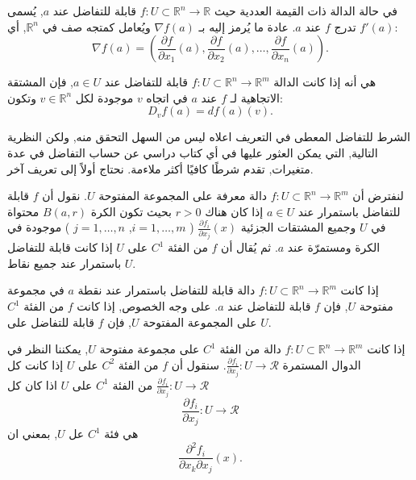في حالة الدالة ذات القيمة العددية حيث \( f : U \subset \mathbb{R}^n \to \mathbb{R} \) قابلة للتفاضل عند \( a \), يُسمى \( f'(a) \) تدرج \( f \) عند \( a \). عادة ما يُرمز إليه بـ \( \nabla f(a) \) ويُعامل كمتجه صف في \( \mathbb{R}^n \), أي:
\[ \nabla f(a) = \left( \frac{\partial f}{\partial x_1} (a), \frac{\partial f}{\partial x_2} (a), \ldots, \frac{\partial f}{\partial x_n} (a) \right). \]

هي أنه إذا كانت الدالة \( f : U \subset \mathbb{R}^n \to \mathbb{R}^m \) قابلة للتفاضل عند \( a \in U \), فإن المشتقة الاتجاهية لـ \( f \) عند \( a \) في اتجاه \( v \) موجودة لكل \( v \in \mathbb{R}^n \) وتكون:
\[ D_v f(a) = df(a)(v). \]

الشرط للتفاضل المعطى في التعريف اعلاه ليس من السهل التحقق منه, ولكن النظرية التالية, التي يمكن العثور عليها في أي كتاب دراسي عن حساب التفاضل في عدة متغيرات, تقدم شرطًا كافيًا أكثر ملاءمة. نحتاج أولاً إلى تعريف آخر.

\begin{definition}
لنفترض أن \( f : U \subset \mathbb{R}^n \to \mathbb{R}^m \) دالة معرفة على المجموعة المفتوحة \( U \). نقول أن \( f \) قابلة للتفاضل باستمرار عند \( a \in U \) إذا كان هناك \( r > 0 \) بحيث تكون الكرة \( B(a, r) \) محتواة في \( U \) وجميع المشتقات الجزئية \( \frac{\partial f_i}{\partial x_j}(x) \) ( \( i = 1, \ldots, m \), \( j = 1, \ldots, n \) ) موجودة في الكرة ومستمرّة عند \( a \). ثم يُقال أن \( f \) من الفئة \( C^1 \) على \( U \) إذا كانت قابلة للتفاضل باستمرار عند جميع نقاط \( U \).
\end{definition}

\begin{theoreme}
إذا كانت \( f : U \subset \mathbb{R}^n \to \mathbb{R}^m \) دالة قابلة للتفاضل باستمرار عند نقطة \( a \) في مجموعة مفتوحة \( U \), فإن \( f \) قابلة للتفاضل عند \( a \). على وجه الخصوص, إذا كانت \( f \) من الفئة \( C^1 \) على المجموعة المفتوحة \( U \), فإن \( f \) قابلة للتفاضل على \( U \).
\end{theoreme}

إذا كانت \( f : U \subset \mathbb{R}^n \to \mathbb{R}^m \) دالة من الفئة \( C^1 \) على مجموعة مفتوحة \( U \), يمكننا النظر في الدوال المستمرة \( \frac{\partial f_i}{\partial x_j} : U \to \mathcal{R} \). سنقول أن \( f \) من الفئة \( C^2 \) على \( U \) إذا كانت كل \( \frac{\partial f_i}{\partial x_j} : U \to \mathcal{R} \) من الفئة \( C^1 \) على \( U \)
اذا كان كل
\[\frac{\partial f_i}{\partial x_j} : U \to \mathcal{R}\] 
هي فئة $C^1$ عل $U$, بمعني ان 
\[
\frac{\partial^2f_i}{\partial x_k \partial x_j}(x).
\]

